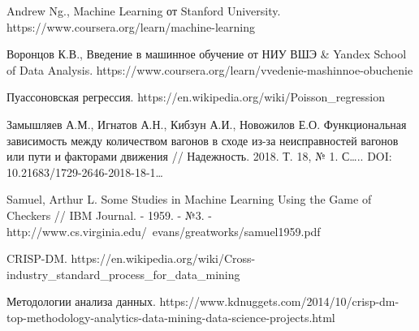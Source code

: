 \begin{thebibliography}{00}
    
     Andrew Ng., Machine Learning от Stanford University. https://www.coursera.org/learn/machine-learning
    
     Воронцов К.В., Введение в машинное обучение от НИУ ВШЭ \& Yandex School of Data Analysis. https://www.coursera.org/learn/vvedenie-mashinnoe-obuchenie
    
     Пуассоновская регрессия. https://en.wikipedia.org/wiki/Poisson\_regression
    
     Замышляев А.М., Игнатов А.Н., Кибзун А.И., Новожилов Е.О. Функциональная зависимость между количеством вагонов в сходе из-за неисправностей вагонов или пути и факторами движения // Надежность. 2018. Т. 18, № 1. С….. DOI: 10.21683/1729-2646-2018-18-1…
    
     Samuel, Arthur L. Some Studies in Machine Learning Using the Game of Checkers // IBM Journal. - 1959. - №3. - http://www.cs.virginia.edu/~evans/greatworks/samuel1959.pdf
    
     CRISP-DM. https://en.wikipedia.org/wiki/Cross-industry\_standard\_process\_for\_data\_mining
    
     Методологии анализа данных. https://www.kdnuggets.com/2014/10/crisp-dm-top-methodology-analytics-data-mining-data-science-projects.html
    
\end{thebibliography}
